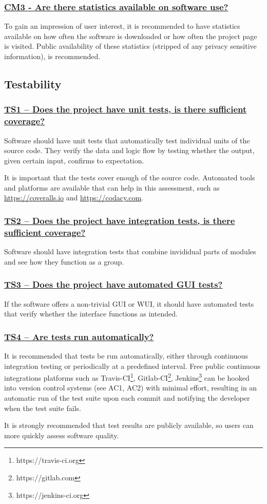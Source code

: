 \documentclass[a4paper,11pt]{article}
\newcommand{\indicator}[1]{\subsubsection*{\underline{#1}}}
\begin{document}
\indicator{CM3 - Are there statistics available on software use?}

To gain an impression of user interest, it is recommended to have statistics
available on how often the software is downloaded or how often the project page
is visited. Public availability of these statistics (stripped of any privacy
sensitive information), is recommended.

\subsection{Testability}

\indicator{TS1 -- Does the project have unit tests, is there sufficient coverage?}

Software should have unit tests that automatically test individual units of the
source code. They verify the data and logic flow by testing whether the output,
given certain input, confirms to expectation.

It is important that the tests cover enough of the source code. Automated tools
and platforms are available that can help in this assessment, such as
\url{https://coveralls.io} and \url{https://codacy.com}.

\indicator{TS2 -- Does the project have integration tests, is there sufficient coverage?}

Software should have integration tests that combine invididual parts of modules and see how they function
as a group.

\indicator{TS3 -- Does the project have automated GUI tests?}

If the software offers a non-trivial GUI or WUI, it should have automated tests
that verify whether the interface functions as intended.

\indicator{TS4 -- Are tests run automatically?}

It is recommended that tests be run automatically, either through continuous
integration testing or periodically at a predefined interval. Free public
continuous integrations platforms such as
Travis-CI\footnote{https://travis-ci.org},
Gitlab-CI\footnote{https://gitlab.com},
Jenkins\footnote{https://jenkins-ci.org} can be hooked into version control
systems (see AC1, AC2) with minimal effort, resulting in an automatic run of the test suite
upon each commit and notifying the developer when the test suite fails.

It is strongly recommended that test results are publicly available, so users
can more quickly assess software quality.
\end{document}
